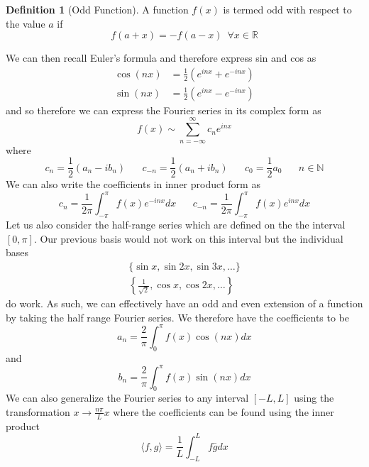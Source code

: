 \documentclass{report}
\theoremstyle{definition}
\newtheorem{definition}[theorem]{Definition}
\theoremstyle{remark}
\newcommand{\R}{\mathbb{R}}
\newcommand{\twen}{\hspace{20pt}}
\begin{document}
\begin{definition} [Odd Function]
    A function $f(x)$ is termed odd with respect to the value $a$ if \begin{equation*}
        f(a+x)=-f(a-x) \,\,\, \forall x\in \R
    \end{equation*}
\end{definition}
We can then recall Euler's formula and therefore express sin and cos as 
\begin{equation*}
    \begin{split}
        \cos(nx)&=\frac{1}{2}(e^{inx}+e^{-inx})\\
        \sin (nx)&=\frac{1}{2}(e^{inx}-e^{-inx})
    \end{split}
\end{equation*}
and so therefore we can express the Fourier series in its complex form as 
\begin{equation*}
    f(x)\sim\sum^\infty_{n=-\infty}c_ne^{inx}
\end{equation*}
where \begin{equation*}
    c_n = \frac{1}{2}(a_n-ib_n)\twen c_{-n}=\frac{1}{2}(a_n+ib_n)\twen c_0=\frac{1}{2}a_0\twen n\in \mathbb{N}
\end{equation*}
We can also write the coefficients in inner product form as 
\begin{equation*}
    c_n = \frac{1}{2\pi}\int^\pi_{-\pi}f(x)e^{-inx}dx \twen c_{-n}=\frac{1}{2\pi}\int^\pi_{-\pi}f(x)e^{inx}dx
\end{equation*}
Let us also consider the half-range series which are defined on the the interval $[0,\pi ]$. Our previous basis would not work on this interval but the individual bases
\begin{equation*}
    \begin{split}
        \{\sin x,\sin 2x,\sin 3x,\ldots \} \\
        \left\{\frac{1}{\sqrt{2}}, \cos x,\cos 2x, \ldots \right \}
    \end{split}
\end{equation*}
do work. As such, we can effectively have an odd and even extension of a function by taking the half range Fourier series. We therefore have the coefficients to be 
\begin{equation*}
    a_n = \frac{2}{\pi}\int^\pi_0f(x)\cos (nx)dx 
\end{equation*}
and 
\begin{equation*}
    b_n = \frac{2}{\pi}\int^\pi_0 f(x)\sin(nx)dx
\end{equation*}
We can also generalize the Fourier series to any interval $[-L,L]$ using the transformation $x\rightarrow \frac{n\pi}{L}x$ where the coefficients can be found using the inner product
\begin{equation*}
    \langle f,g\rangle=\frac{1}{L}\int^L_{-L}f\bar g dx
\end{equation*}
\end{document}
